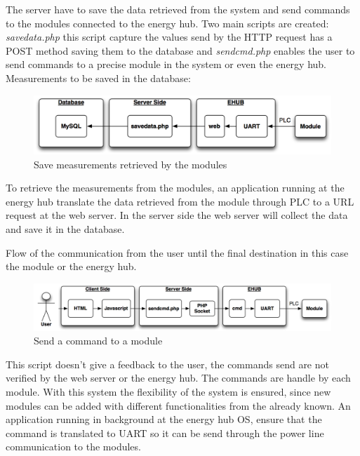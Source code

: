 The server have to save the data retrieved from the system and send commands to the modules connected to the energy hub. Two main scripts are created: \textit{savedata.php} this script capture the values send by the HTTP request has a POST method saving them to the database and \textit{sendcmd.php} enables the user to send commands to a precise module in the system or even the energy hub.
\\
Measurements to be saved in the database:
\begin{figure}[H]
	\begin{centering}
		\includegraphics[width=1\textwidth]{images/tb6_webserver_savedata.png}
		\caption{Save measurements retrieved by the modules}
	\end{centering}
\end{figure}
To retrieve the measurements from the modules, an application running at the energy hub translate the data retrieved from the module through PLC to a URL request at the web server. In the server side the web server will collect the data and save it in the database.

Flow of the communication from the user until the final destination in this case the module or the energy hub.
\begin{figure}[H]
	\begin{centering}
		\includegraphics[width=1\textwidth]{images/tb6_webserver_sendcmd.png}
		\caption{Send a command to a module}
	\end{centering}
\end{figure}
This script doesn't give a feedback to the user, the commands send are not verified by the web server or the energy hub. The commands are handle by each module. With this system the flexibility of the system is ensured, since new modules can be added with different functionalities from the already known.
An application running in background at the energy hub OS, ensure that the command is translated to UART so it can be send through the power line communication to the modules.
\\

